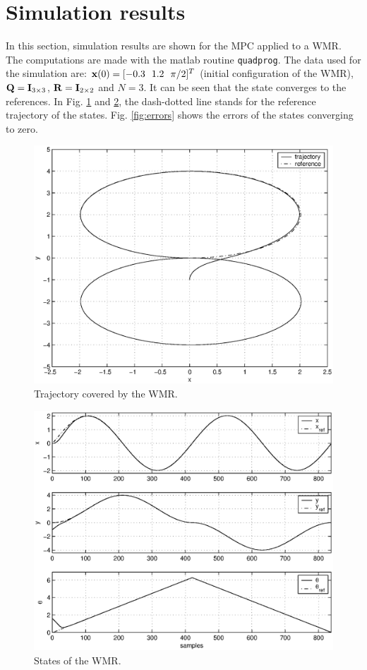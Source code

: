\documentclass[twocolumn]{IEEEtran} %
\begin{document}
\section{Simulation results}\label{sec:simulations}
In this section, simulation results are shown for the MPC applied to a WMR. The computations are made with the {\sc matlab} routine {\tt quadprog}. The data used for the simulation are: ${\bf x}(0)=[-0.3~~1.2~~\pi/2]^T$ (initial configuration of the WMR), ${\bf Q}={\bf I}_{3\times 3}$, ${\bf R}={\bf I}_{2\times 2}$ and $N=3$. It can be seen that the state converges to the references. In Fig. \ref{fig:traj8} and \ref{fig:states}, the dash-dotted line stands for the reference trajectory of the states. Fig. \ref{fig:errors} shows the errors of the states converging to zero.
\begin{figure}[H]\begin{center}
    \includegraphics[width=.95\linewidth]{Figures/traj8.eps}
    \caption{Trajectory covered by the WMR.}
    \label{fig:traj8}
\end{center}\end{figure}
\begin{figure}[H]\begin{center}
    \includegraphics[width=.95\linewidth]{Figures/states.eps}
    \caption{States of the WMR.}
    \label{fig:states}
\end{center}\end{figure}
\end{document}
